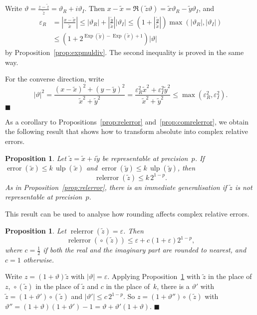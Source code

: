 \documentclass [11pt]{article}
\newcommand {\corr}[1]{{#1}}
\newcommand {\appro}[1]{\widetilde {#1}}
\newcommand {\Ulp}{{\operatorname {ulp}}}
\DeclareMathOperator{\Exp}{\operatorname {Exp}}
\newcommand{\error}{\operatorname {error}}
\newcommand{\relerror}{\operatorname {relerror}}
\newcommand {\round}{\operatorname {\circ}}
\renewcommand {\epsilon}{\varepsilon}
\renewcommand {\theta}{\vartheta}
\renewcommand {\leq}{\leqslant}
\newtheorem{prop}[theorem]{Proposition}
\newenvironment{proof}{\noindent{\bf Proof:}}{{\hspace* {\fill}$\blacksquare$}}
\begin{document}
\begin {proof}
Write $\theta = \frac {\corr z - \appro z}{\appro z}
= \theta_R + i \theta_I$. Then
$\corr x - \appro x = \Re (\appro z \theta)
= \appro x \theta_R - \appro y \theta_I$, and
\begin {align*}
\epsilon_R
&= \left| \frac {\corr x - \appro x}{\appro x} \right|
\leq |\theta_R| + \left| \frac {\appro y}{\appro x} \right| |\theta_I|
\leq \left( 1 + \left| \frac {\appro y}{\appro x} \right| \right)
\max (|\theta_R|, |\theta_I|) \\
&\leq \left( 1 + 2^{\Exp (\appro y) - \Exp (\appro x) + 1} \right)
|\theta|
\end {align*}
by Proposition~\ref {prop:expmuldiv}. The second inequality is proved
in the same way.

For the converse direction, write
\[
|\theta|^2
= \frac {(\corr x - \appro x)^2 + (\corr y - \appro y)^2}{\appro x^2 + \appro y^2}
= \frac {\epsilon_R^2 \appro x^2 + \epsilon_I^2 \appro y^2}{\appro x^2 + \appro y^2}
\leq \max \left( \epsilon_R^2, \epsilon_I^2 \right).
\]
\end {proof}

As a corollary to Propositions~\ref {prop:relerror}
and~\ref {prop:comrelerror}, we obtain the following result that shows how
to transform absolute into complex relative errors.

\begin {prop}
\label {prop:comabstorelerror}
Let $\appro z = \appro x + i \appro y$ be representable at precision~$p$.
If
$\error (\appro x) \leq k \, \Ulp (\appro x)$ and
$\error (\appro y) \leq k \, \Ulp (\appro y)$, then
\[
\relerror (\appro z) \leq k \, 2^{1-p}.
\]
As in Proposition~\ref {prop:relerror}, there is an immediate generalisation
if $\appro z$ is not representable at precision~$p$.
\end {prop}

This result can be used to analyse how rounding affects complex
relative errors.

\begin {prop}
\label {prop:comrelround}
Let $\relerror (\appro z) = \epsilon$.
Then
\[
\relerror (\round (\appro z)) \leq
\epsilon + c (1 + \epsilon) 2^{1-p},
\]
where $c = \frac {1}{2}$ if both the real and the imaginary part are
rounded to nearest, and $c = 1$ otherwise.
\end {prop}

\begin {proof}
Write $\corr z = (1 + \theta) \appro z$ with $|\theta| = \epsilon$.
Applying Proposition~\ref {prop:comabstorelerror} with $\appro z$ in the
place of $\corr z$, $\round (\appro z)$ in the place of $\appro z$
and $c$ in the place of~$k$,
there is a $\theta'$ with $\appro z = (1 + \theta') \round (\appro z)$
and $|\theta'| \leq c \, 2^{1-p}$.
So $\corr z = (1 + \theta'') \round (\appro z)$ with
$\theta'' = (1 + \theta)(1 + \theta') - 1
= \theta + \theta' (1 + \theta)$.
\end {proof}
\end{document}
